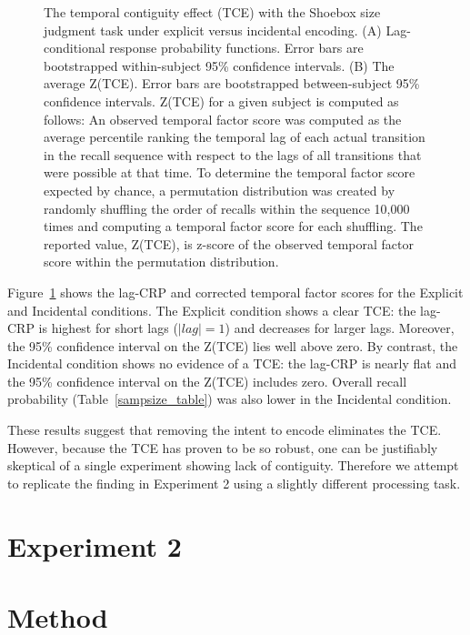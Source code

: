 \documentclass[jou,natbib]{apa6} %
\begin{document}
\newcommand\paneltext{(A) Lag-conditional response probability functions. Error bars are bootstrapped within-subject 95\% confidence intervals. (B) The average Z(TCE).  Error bars are bootstrapped between-subject 95\% confidence intervals. Z(TCE) for a given subject is computed as follows: An observed temporal factor score was computed as the average percentile ranking the temporal lag of each actual transition in the recall sequence with respect to the lags of all transitions that were possible at that time. To determine the temporal factor score expected by chance, a permutation distribution was created by randomly shuffling the order of recalls within the sequence 10,000 times and computing a temporal factor score for each shuffling. The reported value, Z(TCE), is z-score of the observed temporal factor score within the permutation distribution.}
\begin{figure*}
\caption{The temporal contiguity effect (TCE) with the Shoebox size judgment task under explicit versus incidental encoding. \paneltext}
\label{shoebox}
\end{figure*}



Figure~\ref{shoebox} shows the lag-CRP and corrected temporal factor scores for the Explicit and Incidental conditions. The Explicit condition shows a clear TCE: the lag-CRP is highest for short lags ($|lag|=1$) and decreases for larger lags. Moreover, the 95\% confidence interval on the Z(TCE) lies well above zero. By contrast, the Incidental condition shows no evidence of a TCE: the lag-CRP is nearly flat and the 95\% confidence interval on the Z(TCE) includes zero. Overall recall probability (Table~\ref{sampsize_table}) was also lower in the Incidental condition.

These results suggest that removing the intent to encode eliminates the TCE. However, because the TCE has proven to be so robust, one can be justifiably skeptical of a single experiment showing lack of contiguity. Therefore we attempt to replicate the finding in Experiment 2 using a slightly different processing task.

\section{Experiment 2}
\section{Method}
\end{document}
